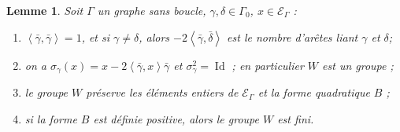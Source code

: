 \documentclass[a4paper,11pt]{article}
\newtheorem{lm}[thm]{Lemme}%
\DeclareMathOperator{\Id}{Id}
\newcommand{\ps}[2]{\left\langle#1,#2\right\rangle}
\newcommand{\EG}{\mathscr{E}_\Gamma}
\begin{document}
		\begin{lm}
			\label{elem}
		Soit $\Gamma$ un graphe sans boucle, $\gamma,\delta\in\Gamma_0$, $x\in\EG$ :
		\begin{enumerate}
			\item $\ps{\bar\gamma}{\bar\gamma}=1$, et si $\gamma\neq\delta$, alors $-2\ps{\bar\gamma}{\bar\delta}$ est le nombre d'arêtes liant $\gamma$ et $\delta$;
			\item on a $\sigma_\gamma(x)=x-2\ps{\bar\gamma}{x}\bar\gamma$ et $\sigma_\gamma^2=\Id$ ; en particulier $W$ est un groupe ;
			\item le groupe $W$ préserve les éléments entiers de $\EG$ et la forme quadratique $B$ ;
			\item si la forme $B$ est définie positive, alors le groupe $W$ est fini.
		\end{enumerate}
\end{lm}
\end{document}
